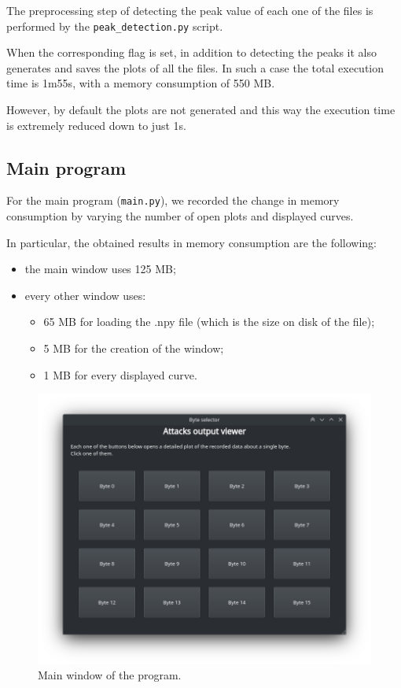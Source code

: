 \documentclass[11pt,a4paper]{article}
\begin{document}
The preprocessing step of detecting the peak value of each one of the files is performed by the \texttt{peak\_detection.py} script.

When the corresponding flag is set, in addition to detecting the peaks it also generates and saves the plots of all the files.
In such a case the total execution time is 1m55s, with a memory consumption of 550 MB.

However, by default the plots are not generated and this way the execution time is extremely reduced down to just 1s.

\subsection{Main program}

For the main program (\texttt{main.py}), we recorded the change in memory consumption by varying the number of open plots and displayed curves.

In particular, the obtained results in memory consumption are the following:
\begin{itemize}
    \item the main window uses 125 MB;
    \item every other window uses:
    \begin{itemize}
    		\item 65 MB for loading the .npy file (which is the size on disk of the file);
    		\item 5 MB for the creation of the window;
    		\item 1 MB for every displayed curve.
	\end{itemize}
\end{itemize}

\begin{figure}[H]
    \centering
    \includegraphics[scale=0.6]{main_window.png}
    \caption{Main window of the program.}
    \label{fig:main_window}
\end{figure}
\end{document}
